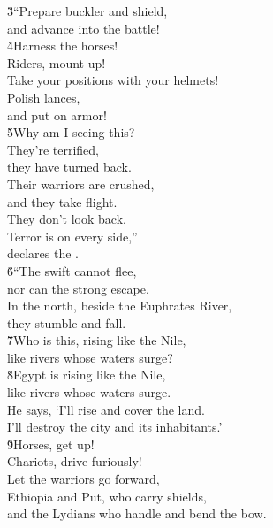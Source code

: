 \begin{poetry}
\poeml \v{3}``Prepare buckler and shield, \\
\poemll    and advance into the battle! \\
\poeml \v{4}Harness the horses! \\
\poemll    Riders, mount up! \\
\poeml Take your positions with your helmets! \\
\poemll    Polish lances, \\
\poemll    and put on armor! \\
\poeml \v{5}Why am I seeing this? \\
\poeml They're terrified, \\
\poemll    they have turned back. \\
\poeml Their warriors are crushed, \\
\poemll    and they take flight. \\
\poeml They don't look back. \\
\poemll    Terror is on every side,'' \\
\poemlll       declares the . \\
\poeml \v{6}``The swift cannot flee, \\
\poemll    nor can the strong escape. \\
\poeml In the north, beside the Euphrates River, \\
\poemll    they stumble and fall. \\
\poeml \v{7}Who is this, rising like the Nile, \\
\poemll    like rivers whose waters surge? \\
\poeml \v{8}Egypt is rising like the Nile, \\
\poemll    like rivers whose waters surge. \\
\poeml He says, `I'll rise and cover the land. \\
\poemll    I'll destroy the city and its inhabitants.' \\
\poeml \v{9}Horses, get up! \\
\poeml Chariots, drive furiously! \\
\poeml Let the warriors go forward, \\
\poemll    Ethiopia and Put, who carry shields, \\
\poemlll       and the Lydians who handle and bend the bow. \\

\end{poetry}
